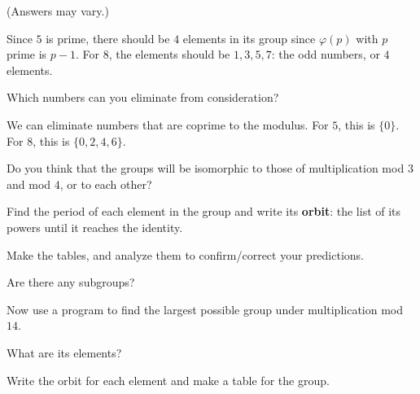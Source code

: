\documentclass[../gatm_answers.tex]{subfiles}
\begin{document}
(Answers may vary.)

Since $5$ is prime, there should be $4$ elements in its group since $\varphi(p)$ with $p$ prime is $p-1$. For $8$, the elements should be $1,3,5,7$: the odd numbers, or $4$ elements.

\begin{inner_problem}
\item Which numbers can you eliminate from consideration?
\end{inner_problem}

We can eliminate numbers that are coprime to the modulus. For $5$, this is $\{0\}$. For $8$, this is $\{0,2,4,6\}$.

\begin{inner_problem}
\item Do you think that the groups will be isomorphic to those of multiplication mod $3$ and mod $4$, or to each other?
\end{inner_problem}

\begin{inner_problem}
\item Find the period of each element in the group and write its \textbf{orbit}: the list of its powers until it reaches the identity.
\end{inner_problem}

\begin{inner_problem}
\item Make the tables, and analyze them to confirm/correct your predictions.
\end{inner_problem}

\begin{inner_problem}
\item Are there any subgroups?
\end{inner_problem}

\begin{outer_problem}
\item Now use a program to find the largest possible group under multiplication mod $14$.
\end{outer_problem}

\begin{inner_problem}[start=1]
\item What are its elements?
\end{inner_problem}

\begin{inner_problem}
\item Write the orbit for each element and make a table for the group.
\end{inner_problem}
\end{document}
